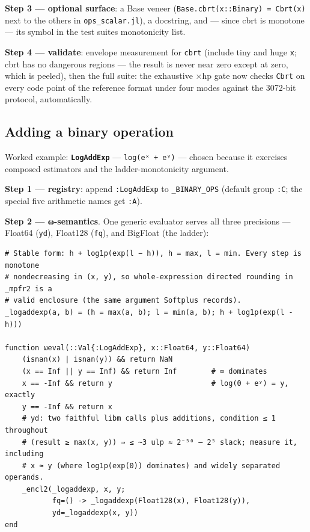 \textbf{Step 3 — optional surface}: a Base veneer (\texttt{Base.cbrt(x::Binary) = Cbrt(x)} next to the others in \texttt{ops\_scalar.jl}), a docstring, and — since cbrt is monotone — its symbol in the test suite{\textquotesingle}s monotonicity list.



\textbf{Step 4 — validate}: envelope measurement for \texttt{cbrt} (include tiny and huge \texttt{x}; cbrt has no dangerous regions — the result is never near zero except at zero, which is peeled), then the full suite: the exhaustive ×hp gate now checks \texttt{Cbrt} on every code point of the reference format under four modes against the 3072-bit protocol, automatically.



\subsection{Adding a binary operation}



\label{7660721820420346737}{}


Worked example: \textbf{\texttt{LogAddExp}} — \texttt{log(eˣ + eʸ)} — chosen because it exercises composed estimators and the ladder-monotonicity argument.



\textbf{Step 1 — registry}: append \texttt{:LogAddExp} to \texttt{\_BINARY\_OPS} (default group \texttt{:C}; the special five arithmetic names get \texttt{:A}).



\textbf{Step 2 — ω-semantics}. One generic evaluator serves all three precisions — Float64 (\texttt{yd}), Float128 (\texttt{fq}), and BigFloat (the ladder):




\begin{verbatim}
# Stable form: h + log1p(exp(l − h)), h = max, l = min. Every step is monotone
# nondecreasing in (x, y), so whole-expression directed rounding in _mpfr2 is a
# valid enclosure (the same argument Softplus records).
_logaddexp(a, b) = (h = max(a, b); l = min(a, b); h + log1p(exp(l - h)))

function ωeval(::Val{:LogAddExp}, x::Float64, y::Float64)
    (isnan(x) | isnan(y)) && return NaN
    (x == Inf || y == Inf) && return Inf        # ∞ dominates
    x == -Inf && return y                       # log(0 + eʸ) = y, exactly
    y == -Inf && return x
    # yd: two faithful libm calls plus additions, condition ≤ 1 throughout
    # (result ≥ max(x, y)) ⇒ ≤ ~3 ulp ≈ 2⁻⁵⁰ — 2⁵ slack; measure it, including
    # x ≈ y (where log1p(exp(0)) dominates) and widely separated operands.
    _encl2(_logaddexp, x, y;
           fq=() -> _logaddexp(Float128(x), Float128(y)),
           yd=_logaddexp(x, y))
end
\end{verbatim}



